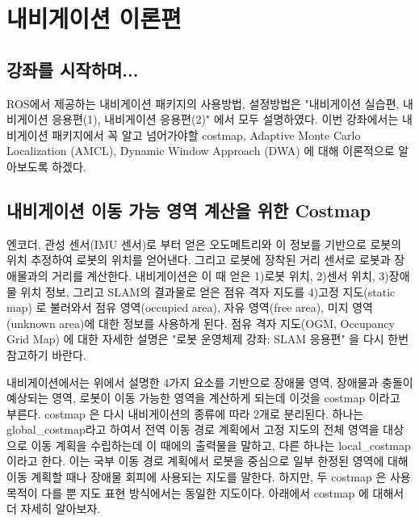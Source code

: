 \section{내비게이션 이론편}

\subsection{강좌를 시작하며...}

ROS에서 제공하는 내비게이션 패키지의 사용방법, 설정방법은 "내비게이션 실습편, 내비게이션 응용편(1), 내비게이션 응용편(2)" 에서 모두 설명하였다. 이번 강좌에서는 내비게이션 패키지에서 꼭 알고 넘어가야할 costmap, Adaptive Monte Carlo Localization (AMCL), Dynamic Window Approach (DWA) 에 대해 이론적으로 알아보도록 하겠다.

\subsection{내비게이션 이동 가능 영역 계산을 위한 Costmap}

엔코더, 관성 센서(IMU 센서)로 부터 얻은 오도메트리와 이 정보를 기반으로 로봇의 위치 추정하여 로봇의 위치를 얻어낸다. 그리고 로봇에 장착된 거리 센서로 로봇과 장애물과의 거리를 계산한다. 내비게이션은 이 때 얻은 1)로봇 위치, 2)센서 위치, 3)장애물 위치 정보, 그리고 SLAM의 결과물로 얻은 점유 격자 지도를 4)고정 지도(static map) 로 불러와서 점유 영역(occupied area), 자유 영역(free area), 미지 영역(unknown area)에 대한 정보를 사용하게 된다. 점유 격자 지도(OGM, Occupancy Grid Map) 에 대한 자세한 설명은 "로봇 운영체제 강좌: SLAM 응용편" 을 다시 한번 참고하기 바란다.

내비게이션에서는 위에서 설명한 4가지 요소를 기반으로 장애물 영역, 장애물과 충돌이 예상되는 영역, 로봇이 이동 가능한 영역을 계산하게 되는데 이것을 costmap 이라고 부른다. costmap 은 다시 내비게이션의 종류에 따라 2개로 분리된다. 하나는 global\_costmap라고 하여서 전역 이동 경로 계획에서 고정 지도의 전체 영역을 대상으로 이동 계획을 수립하는데 이 때에의 출력물을 말하고, 다른 하나는 local\_costmap 이라고 한다. 이는 국부 이동 경로 계획에서 로봇을 중심으로 일부 한정된 영역에 대해 이동 계획할 때나 장애물 회피에 사용되는 지도를 말한다. 하지만, 두 costmap 은 사용 목적이 다를 뿐 지도 표현 방식에서는 동일한 지도이다. 아래에서 costmap 에 대해서 더 자세히 알아보자.

